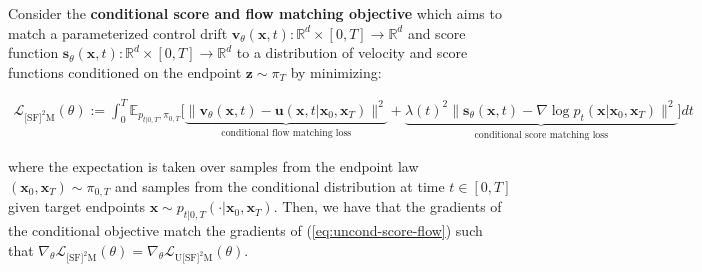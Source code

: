\documentclass{article}
\begin{document}
\begin{proposition}\label{def:score-flow-objective}
Consider the \textbf{conditional score and flow matching objective} which aims to match a parameterized control drift $\boldsymbol{v}_\theta(\boldsymbol{x},t):\mathbb{R}^d\times[0,T]\to \mathbb{R}^d$ and score function $\boldsymbol{s}_\theta(\boldsymbol{x},t):\mathbb{R}^d\times[0,T]\to \mathbb{R}^d$ to a distribution of velocity and score functions conditioned on the endpoint $\boldsymbol{z} \sim \pi_T$ by minimizing:
\begin{small}
\begin{align}
    \mathcal{L}_{\text{[SF]}^2\text{M}}(\theta):=\int_0^T\mathbb{E}_{p_{t|0,T}, \pi_{0,T}}\bigg[\underbrace{\|\boldsymbol{v}_\theta(\boldsymbol{x},t)-\boldsymbol{u}(\boldsymbol{x},t|\boldsymbol{x}_0,\boldsymbol{x}_T)\|^2}_{\text{conditional flow matching loss}}+\underbrace{\lambda(t)^2\|\boldsymbol{s}_\theta(\boldsymbol{x},t)-\nabla \log p_t(\boldsymbol{x}|\boldsymbol{x}_0,\boldsymbol{x}_T)\|^2}_{\text{conditional score matching loss}}\bigg]dt \tag{Conditional Objective}\label{eq:sf2m-objective}
\end{align}
\end{small}
where the expectation is taken over samples from the endpoint law $(\boldsymbol{x}_0,\boldsymbol{x}_T)\sim \pi_{0,T}$ and samples from the conditional distribution at time $t\in [0,T]$ given target endpoints $\boldsymbol{x}\sim p_{t|0,T}(\cdot|\boldsymbol{x}_0,\boldsymbol{x}_T)$. Then, we have that the gradients of the conditional objective match the gradients of (\ref{eq:uncond-score-flow}) such that $\nabla_{\theta}\mathcal{L}_{\text{[SF]}^2\text{M}}(\theta)=\nabla_{\theta}\mathcal{L}_{\text{U[SF]}^2\text{M}}(\theta)$.
\end{proposition}
\end{document}

